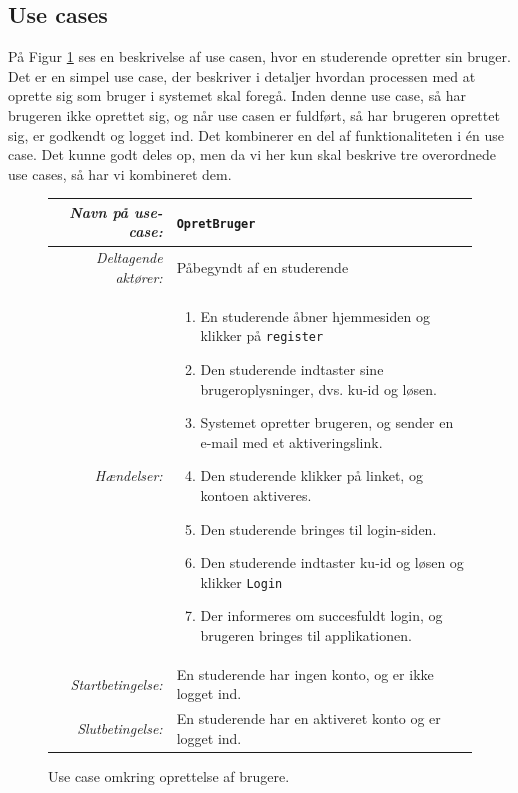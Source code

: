 \documentclass[11pt, a4paper]{article}
\begin{document}
\subsection{Use cases}
\label{sub:use_cases}

På Figur \ref{fig:use_case1} ses en beskrivelse af use casen, hvor en studerende opretter sin bruger. Det er en simpel use case, der beskriver i detaljer hvordan processen med at oprette sig som bruger i systemet skal foregå. Inden denne use case, så har brugeren ikke oprettet sig, og når use casen er fuldført, så har brugeren oprettet sig, er godkendt og logget ind. Det kombinerer en del af funktionaliteten i én use case. Det kunne godt deles op, men da vi her kun skal beskrive tre overordnede use cases, så har vi kombineret dem.
\begin{figure}[h!]
    \centering
    \begin{tabular}{r p{8cm}}
        \toprule
        \textit{Navn på use-case:} & \verb!OpretBruger! \\
        \hline
        \textit{Deltagende aktører:} & Påbegyndt af en studerende \\
        \hline
        \textit{Hændelser:} & \begin{enumerate}[nolistsep]
            \item En studerende åbner hjemmesiden og klikker på \verb!register!
            \item Den studerende indtaster sine brugeroplysninger, dvs. ku-id og løsen.
            \item Systemet opretter brugeren, og sender en e-mail med et aktiveringslink.
            \item Den studerende klikker på linket, og kontoen aktiveres.
            \item Den studerende bringes til login-siden.
            \item Den studerende indtaster ku-id og løsen og klikker \verb!Login!
            \item Der informeres om succesfuldt login, og brugeren bringes til applikationen.
        \end{enumerate}  \\
        \hline
        \textit{Startbetingelse:} & En studerende har ingen konto, og er ikke logget ind. \\
        \hline
        \textit{Slutbetingelse:} & En studerende har en aktiveret konto og er logget ind. \\
        \bottomrule
    \end{tabular}
    \caption{Use case omkring oprettelse af brugere.}
    \label{fig:use_case1}
\end{figure}
\end{document}
